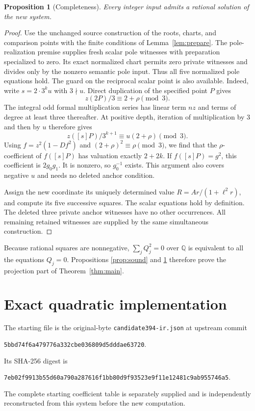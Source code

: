 \documentclass[11pt,a4paper]{article}
\newtheorem{proposition}[theorem]{Proposition}
\theoremstyle{definition}\newtheorem{definition}[theorem]{Definition}
\theoremstyle{remark}\newtheorem{remark}[theorem]{Remark}
\newcommand{\Q}{\mathbb Q}\newcommand{\Z}{\mathbb Z}
\begin{document}
\begin{proposition}[Completeness]\label{prop:complete}
Every integer input admits a rational solution of the new system.
\end{proposition}
\begin{proof}
Use the unchanged source construction of the roots, charts, and
comparison points with the finite conditions of Lemma~\ref{lem:prepare}.
The pole-realization premise supplies fresh scalar pole witnesses
with preparation specialized to zero. Its exact normalized chart
permits zero private witnesses and divides only by the nonzero
semantic pole input. Thus all five normalized pole equations hold.
The guard on the reciprocal scalar point is also available. Indeed,
write $s=2\cdot3^ku$ with $3\nmid u$. Direct duplication of the
specified point $P$ gives
\[
                z(2P)/3\equiv2+\rho\pmod3.
\]
The integral odd formal multiplication series has linear term $nz$
and terms of degree at least three thereafter. At positive depth,
iteration of multiplication by $3$ and then by $u$ therefore gives
\[
 z([s]P)/3^{k+1}\equiv u(2+\rho)\pmod3.
\]
Using $f=z^2(1-Df^2)$ and $(2+\rho)^2\equiv\rho\pmod3$,
we find that the $\rho$-coefficient of $f([s]P)$ has valuation exactly
$2+2k$. If $f([s]P)=g^2$, this coefficient is $2g_0g_1$.
It is nonzero, so $g_0^{-1}$ exists. This argument also covers negative
$u$ and needs no deleted anchor condition.

Assign the new coordinate its uniquely determined value
$R=Ar/(1+\ell^2r)$, and compute its five successive squares.
The scalar equations hold by definition. The deleted three private
anchor witnesses have no other occurrences. All remaining retained
witnesses are supplied by the same simultaneous construction.
\end{proof}
Because rational squares are nonnegative, $\sum_j Q_j^2=0$ over
$\Q$ is equivalent to all the equations $Q_j=0$. Propositions
\ref{prop:sound} and \ref{prop:complete} therefore prove the
projection part of Theorem~\ref{thm:main}.

\clearpage
\section{Exact quadratic implementation}\label{sec:data}
The starting file is the original-byte
\nolinkurl{candidate394-ir.json} at upstream commit
\begin{center}\small
\nolinkurl{5bbd74f6a479776a332cbe036809d5dddae63720}.
\end{center}
Its SHA-256 digest is
\begin{center}\small
\nolinkurl{7eb02f9913b55d60a790a287616f1bb80d9f93523e9f11e12481c9ab955746a5}.
\end{center}
The complete starting coefficient table is separately supplied and is
independently reconstructed from this system before the new computation.
\end{document}
